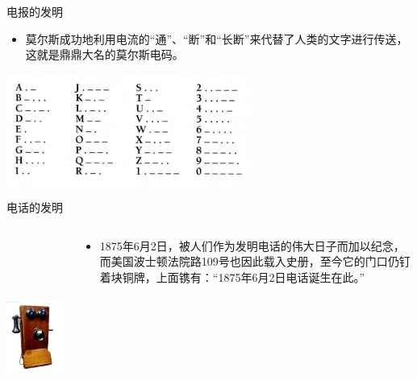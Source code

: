 \documentclass{ctexbeamer}
\begin{document}
\begin{frame}{电报的发明}
  \begin{itemize}
    \item 莫尔斯成功地利用电流的“通”、“断”和“长断”来代替了人类的文字进行传送，这就是鼎鼎大名的莫尔斯电码。
  \end{itemize}
  \centering
  \includegraphics[width=8cm]{morsecode}
\end{frame}

\begin{frame}{电话的发明}
  \begin{columns}
    \begin{column}{0.35\linewidth}
      \includegraphics[height=6.5cm]{dianhua}
    \end{column}
    \begin{column}{0.65\linewidth}
      \begin{itemize}
        \item 1875年6月2日，被人们作为发明电话的伟大日子而加以纪念，而美国波士顿法院路109号也因此载入史册，至今它的门口仍钉着块铜牌，上面镌有：“1875年6月2日电话诞生在此。”
      \end{itemize}
    \end{column}
  \end{columns}
\end{frame}
\end{document}
